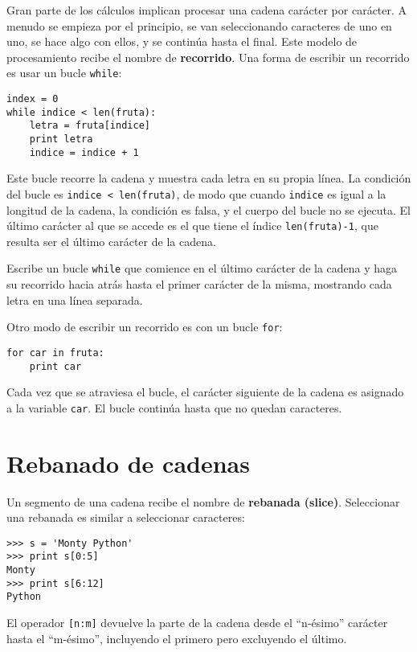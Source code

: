 Gran parte de los cálculos implican procesar una cadena carácter por
carácter. A menudo se empieza por el principio, se van seleccionando caracteres
de uno en uno, se hace algo con ellos, y se continúa hasta el final. Este modelo
de procesamiento recibe el nombre de {\bf recorrido}. Una forma de escribir un recorrido
es usar un bucle {\tt while}:

\beforeverb
\begin{verbatim}
index = 0
while indice < len(fruta):
    letra = fruta[indice]
    print letra
    indice = indice + 1
\end{verbatim}
\afterverb
%
Este bucle recorre la cadena y muestra cada letra en su propia línea.
La condición del bucle es {\tt indice < len(fruta)}, de modo
que cuando {\tt indice} es igual a la longitud de la cadena, la
condición es falsa, y el cuerpo del bucle no se ejecuta. El
último carácter al que se accede es el que tiene el índice {\tt len(fruta)-1},
que resulta ser el último carácter de la cadena.

\begin{ex}
Escribe un bucle {\tt while} que comience en el último carácter de la cadena
y haga su recorrido hacia atrás hasta el primer carácter de la misma,
mostrando cada letra en una línea separada.
\end{ex}

Otro modo de escribir un recorrido es con un bucle {\tt for}:

\beforeverb
\begin{verbatim}
for car in fruta:
    print car
\end{verbatim}
\afterverb
%
Cada vez que se atraviesa el bucle, el carácter siguiente de la cadena es asignado
a la variable {\tt car}. El bucle continúa hasta que no quedan caracteres.


\section{Rebanado de cadenas}
\label{slice}


Un segmento de una cadena recibe el nombre de {\bf rebanada (slice)}.
Seleccionar una rebanada es similar a seleccionar caracteres:

\beforeverb
\begin{verbatim}
>>> s = 'Monty Python'
>>> print s[0:5]
Monty
>>> print s[6:12]
Python
\end{verbatim}
\afterverb
%
El operador {\tt [n:m]} devuelve la parte de la cadena desde el
``n-ésimo'' carácter hasta el ``m-ésimo'', incluyendo el primero
pero excluyendo el último.

